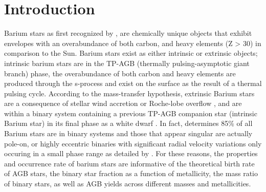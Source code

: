 \documentclass[a4paper,fleqn,usenatbib]{mnras}
\begin{document}


\section{Introduction} \label{sec:intro}

Barium stars as first recognized by \citet{Bidelman1951}, are chemically unique objects that exhibit envelopes with an overabundance of both carbon, and heavy elements (Z > 30) in comparison to the Sun. Barium stars exist as either intrinsic or extrinsic objects; intrinsic barium stars are in the TP-AGB (thermally pulsing-asymptotic giant branch) phase, the overabundance of both carbon and heavy elements are produced through the s-process and exist on the surface as the result of a thermal pulsing cycle. According to the mass-transfer hypothesis, extrinsic Barium stars are a consequence of stellar wind accretion \citep{boffin1988,jorissen1992} or Roche-lobe overflow \citep{webbink1986}, and are within a binary system containing a previous TP-AGB companion star (intrinsic Barium star) in its final phase as a white dwarf \citep{bohm1980,bohm1984}. In fact, \citet{mcclure1983} determines 85\% of all Barium stars are in binary systems and those that appear singular are actually pole-on, or highly eccentric binaries with significant radial velocity variations only occuring in a small phase range as detailed by \citet{pourbaix2004}. For these reasons, the properties and occurrence rate of barium stars are informative of the theoretical birth rate of AGB stars, the binary star fraction as a function of metallicity, the mass ratio of binary stars, as well as AGB yields across different masses and metallicities. 
\end{document}
